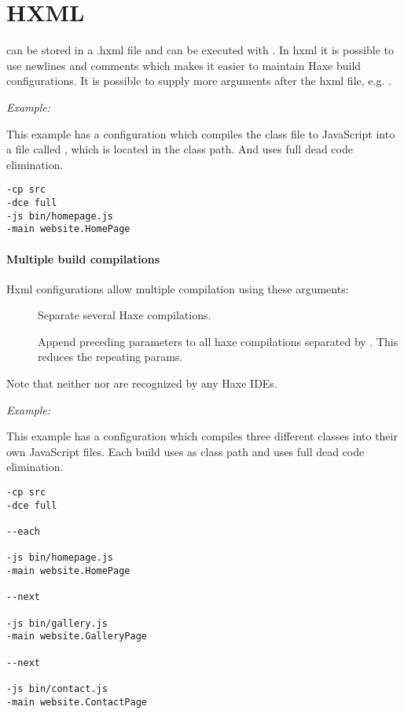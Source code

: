 \section{HXML}
\label{compiler-usage-hxml}

 can be stored in a .hxml file and can be executed with .
In hxml it is possible to use newlines and comments which makes it easier to maintain Haxe build configurations.
It is possible to supply more arguments after the hxml file, e.g. .

\emph{Example:}

This example has a configuration which compiles the class file  to JavaScript into a file called , which is located in the  class path. And uses full dead code elimination.

\begin{lstlisting}
-cp src
-dce full
-js bin/homepage.js
-main website.HomePage
\end{lstlisting}

\paragraph{Multiple build compilations}

Hxml configurations allow multiple compilation using these arguments:

\begin{description}
	\item[] Separate several Haxe compilations.
	\item[] Append preceding parameters to all haxe compilations separated by . This reduces the repeating params.	
\end{description}
\begin{description} 
	Note that neither  nor  are recognized by any Haxe IDEs.	
\end{description}

\emph{Example:}

This example has a configuration which compiles three different classes into their own JavaScript files. Each build uses  as class path and uses full dead code elimination.

\begin{lstlisting}
-cp src
-dce full

--each

-js bin/homepage.js
-main website.HomePage

--next  

-js bin/gallery.js
-main website.GalleryPage

--next  

-js bin/contact.js
-main website.ContactPage
\end{lstlisting}

